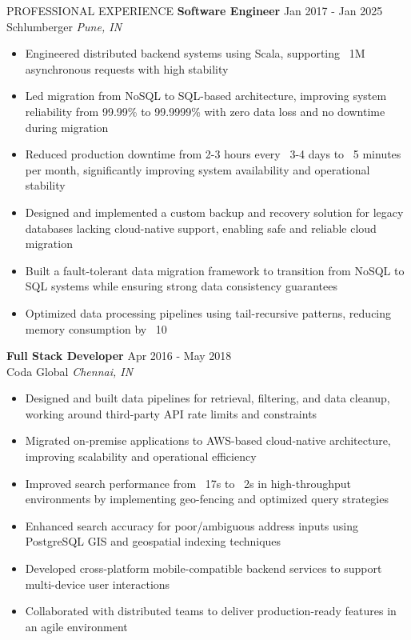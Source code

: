 \documentclass{resume} %
\begin{document}
\begin{rSection}{PROFESSIONAL EXPERIENCE}
\textbf{Software Engineer} \hfill Jan 2017 - Jan 2025\\
Schlumberger \hfill \textit{Pune, IN}
 \begin{itemize}
    \itemsep -3pt {} 
     \item Engineered distributed backend systems using Scala, supporting ~1M asynchronous requests with high stability
     \item Led migration from NoSQL to SQL-based architecture, improving system reliability from 99.99\% to 99.9999\% with zero data loss and no downtime during migration
     \item Reduced production downtime from 2-3 hours every ~3-4 days to ~5 minutes per month, significantly improving system availability and operational stability
     \item Designed and implemented a custom backup and recovery solution for legacy databases lacking cloud-native support, enabling safe and reliable cloud migration
     \item Built a fault-tolerant data migration framework to transition from NoSQL to SQL systems while ensuring strong data consistency guarantees
     \item Optimized data processing pipelines using tail-recursive patterns, reducing memory consumption by ~10%
 \end{itemize}

\textbf{Full Stack Developer} \hfill Apr 2016 - May 2018\\
Coda Global \hfill \textit{Chennai, IN}
 \begin{itemize}
    \itemsep -3pt {} 
     \item Designed and built data pipelines for retrieval, filtering, and data cleanup, working around third-party API rate limits and constraints
     \item Migrated on-premise applications to AWS-based cloud-native architecture, improving scalability and operational efficiency
     \item Improved search performance from ~17s to ~2s in high-throughput environments by implementing geo-fencing and optimized query strategies
     \item Enhanced search accuracy for poor/ambiguous address inputs using PostgreSQL GIS and geospatial indexing techniques
     \item Developed cross-platform mobile-compatible backend services to support multi-device user interactions
     \item Collaborated with distributed teams to deliver production-ready features in an agile environment
\end{itemize}


\end{rSection}
\end{document}
